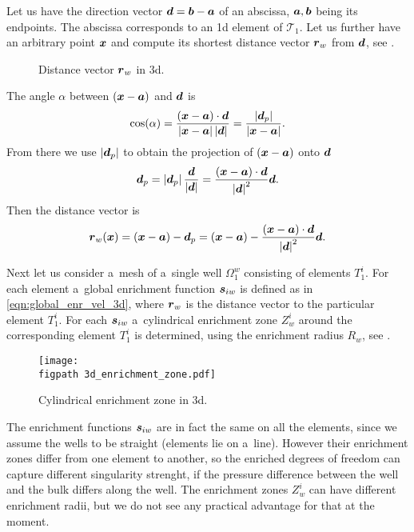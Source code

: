 Let us have the direction vector $\mathbf{\boldsymbol{d}} = \mathbf{\boldsymbol{b}} - \mathbf{\boldsymbol{a}}$ of an abscissa, $\mathbf{\boldsymbol{a}}, \mathbf{\boldsymbol{b}}$ being its endpoints. 
The abscissa corresponds to an 1d element of $\mathcal{T}_1$.
Let us further have an arbitrary point $\mathbf{\boldsymbol{x}}$ and compute its 
shortest distance vector $\mathbf{\boldsymbol{r}}_w$ from $\mathbf{\boldsymbol{d}}$, see .
%
\begin{figure}[!htb]
  \vspace{5pt}
  \centering
  \def\svgwidth{0.5\textwidth}
  
  \caption{Distance vector $\mathbf{\boldsymbol{r}}_w$ in 3d.}
  \label{fig:distance_vector_3d}
\end{figure}
%
The angle $\alpha$ between $(\mathbf{\boldsymbol{x}} - \mathbf{\boldsymbol{a}})$ and $\mathbf{\boldsymbol{d}}$ is 
\[
\cos(\alpha) = \frac{(\mathbf{\boldsymbol{x}} - \mathbf{\boldsymbol{a}})\cdot\mathbf{\boldsymbol{d}}}{\left|\mathbf{\boldsymbol{x}} - \mathbf{\boldsymbol{a}}\right|\left|\mathbf{\boldsymbol{d}}\right|} = \frac{\left|\mathbf{\boldsymbol{d}}_p\right|}{\left|\mathbf{\boldsymbol{x}} - \mathbf{\boldsymbol{a}}\right|}.
\]
From there we use $\left|\mathbf{\boldsymbol{d}}_p\right|$ to obtain the projection of $(\mathbf{\boldsymbol{x}}-\mathbf{\boldsymbol{a}})$ onto $\mathbf{\boldsymbol{d}}$
\[
\mathbf{\boldsymbol{d}}_p = \left|\mathbf{\boldsymbol{d}}_p\right|\frac{\mathbf{\boldsymbol{d}}}{\left|\mathbf{\boldsymbol{d}}\right|} = \frac{(\mathbf{\boldsymbol{x}} - \mathbf{\boldsymbol{a}})\cdot\mathbf{\boldsymbol{d}}}{\left|\mathbf{\boldsymbol{d}}\right|^2} \mathbf{\boldsymbol{d}}.
\]
Then the distance vector is
\begin{equation} \label{eqn:distance_vector_in_3d}
  \mathbf{\boldsymbol{r}}_w(\mathbf{\boldsymbol{x}}) = (\mathbf{\boldsymbol{x}} - \mathbf{\boldsymbol{a}}) - \mathbf{\boldsymbol{d}}_p = (\mathbf{\boldsymbol{x}} - \mathbf{\boldsymbol{a}}) - \frac{(\mathbf{\boldsymbol{x}} - \mathbf{\boldsymbol{a}})\cdot\mathbf{\boldsymbol{d}}}{\left|\mathbf{\boldsymbol{d}}\right|^2} \mathbf{\boldsymbol{d}}.
\end{equation}

Next let us consider a~mesh of a~single well $\Omega^w_1$ consisting of elements $T^i_1$.
For each element a~global enrichment function $\mathbf{\boldsymbol{s}}_{iw}$ is defined as in \eqref{eqn:global_enr_vel_3d},
where $\mathbf{\boldsymbol{r}}_w$ is the distance vector to the particular element $T^i_1$.
For each $\mathbf{\boldsymbol{s}}_{iw}$ a~cylindrical enrichment zone $Z^i_w$ around the corresponding element $T^i_1$ is determined, 
using the enrichment radius $R_w$, see .
%
\begin{figure}[!htb]
    \centering    
    \texttt{[image: \\figpath 3d\_enrichment\_zone.pdf]} 
    \caption{Cylindrical enrichment zone in 3d.}
  \label{fig:enrichment_zone_in_3d}
\end{figure}
%
The enrichment functions $\mathbf{\boldsymbol{s}}_{iw}$ are in fact the same on all the elements,
since we assume the wells to be straight (elements lie on a~line). However their enrichment zones differ from one element to another,
so the enriched degrees of freedom can capture different singularity strenght, if the pressure difference between
the well and the bulk differs along the well.
The enrichment zones $Z^i_w$ can have different enrichment radii, but we do not see any practical advantage for that at the moment.


